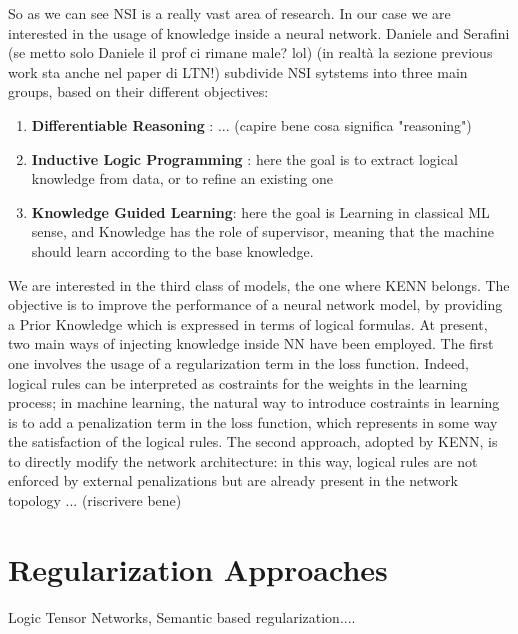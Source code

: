 So as we can see NSI is a really vast area of research. In our case we are interested in the usage of knowledge inside a neural network. Daniele and Serafini (se metto solo Daniele il prof ci rimane male? lol) \cite{daniele2019kenn} (in realtà la sezione previous work sta anche nel paper di LTN!) subdivide NSI sytstems into three main groups, based on their different objectives:
\begin{enumerate}
	\item \textbf{Differentiable Reasoning }: ... (capire bene cosa significa "reasoning")
	\item \textbf{Inductive Logic Programming} : here the goal is to extract logical knowledge from data, or to refine an existing one
	\item \textbf{Knowledge Guided Learning}: here the goal is Learning in classical ML sense, and Knowledge has the role of supervisor, meaning that the machine should learn according to the base knowledge.
\end{enumerate}

We are interested in the third class of models, the one where KENN belongs. The objective is to improve the performance of a neural network model, by providing a Prior Knowledge which is expressed in terms of logical formulas. At present, two main ways of injecting knowledge inside NN have been employed. The first one involves the usage of a regularization term in the loss function. Indeed, logical rules can be interpreted as costraints for the weights in the learning process; in machine learning, the natural way to introduce costraints in learning is to add a penalization term in the loss function, which represents in some way the satisfaction of the logical rules. The second approach, adopted by KENN, is to directly modify the network architecture: in this way, logical rules are not enforced by external penalizations but are already present in the network topology ... (riscrivere bene)

\section{Regularization Approaches}
Logic Tensor Networks, Semantic based regularization....

